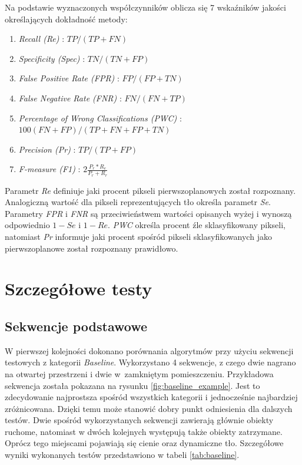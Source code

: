 \noindent Na podstawie wyznaczonych współczynników oblicza się 7 wskaźników jakości określających dokładność metody:
%
\begin{enumerate}[nolistsep]
	\item \textit{Recall (Re)} : \tab \small{$TP/(TP+FN)$}
	\item \textit{Specificity (Spec)} : \tab \small{$TN/(TN+FP)$}
	\item \textit{False Positive Rate (FPR)} : \tab \small{$FP/(FP + TN)$}
	\item \textit{False Negative Rate (FNR)} : \tab \small{$FN/(FN + TP)$}
	\item \textit{Percentage of Wrong Classifications (PWC)} : \tab \small{$100(FN + FP)/(TP + FN + FP + TN)$}
	\item \textit{Precision (Pr)} : \tab \small{$TP/(TP + FP)$}
	\item \textit{F-measure (F1)} : \tab \small{$2\frac{P_r*R_e}{P_r+R_r}$}\\
\end{enumerate}

Parametr \textit{Re} definiuje jaki procent pikseli pierwszoplanowych został rozpoznany. 
Analogiczną wartość dla pikseli reprezentujących tło określa parametr \textit{Se}. 
Parametry \textit{FPR} i \textit{FNR} są przeciwieństwem wartości opisanych wyżej i wynoszą odpowiednio $1-Se$ i $1-Re$. 
\textit{PWC} określa procent źle sklasyfikowany pikseli, natomiast \textit{Pr} informuje jaki procent spośród pikseli sklasyfikowanych jako pierwszoplanowe został rozpoznany prawidłowo.

\section{Szczegółowe testy}
\label{sec:testy}

\subsection{Sekwencje podstawowe}
\label{subsec:sewkencje_podstawowe}

W pierwszej kolejności dokonano porównania algorytmów przy użyciu sekwencji testowych z kategorii \textit{Baseline}. 
Wykorzystano 4 sekwencje, z czego dwie nagrano na otwartej przestrzeni i dwie w~zamkniętym pomieszczeniu. 
Przykładowa sekwencja została pokazana na rysunku \ref{fig:baseline_example}. 
Jest to zdecydowanie najprostsza spośród wszystkich kategorii i jednocześnie najbardziej zróżnicowana. 
Dzięki temu może stanowić dobry punkt odniesienia dla dalszych testów. 
Dwie spośród wykorzystanych sekwencji zawierają głównie obiekty ruchome, natomiast w dwóch kolejnych występują także obiekty zatrzymane. 
Oprócz tego miejscami pojawiają się cienie oraz dynamiczne tło. 
Szczegółowe wyniki wykonanych testów przedstawiono w tabeli \ref{tab:baseline}.

